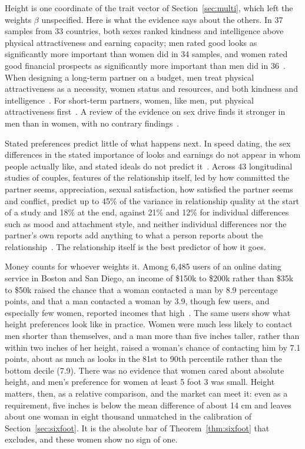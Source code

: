 \documentclass[11pt]{article}
\theoremstyle{definition}
\theoremstyle{remark}
\begin{document}
Height is one coordinate of the trait vector of Section~\ref{sec:multi},
which left the weights $\beta$ unspecified. Here is what the evidence
says about the others. In 37 samples from 33 countries, both sexes
ranked kindness and intelligence above physical attractiveness and
earning capacity; men rated good looks as significantly more important
than women did in 34 samples, and women rated good financial prospects
as significantly more important than men did in 36~\cite{buss}. When
designing a long-term partner on a budget, men treat physical
attractiveness as a necessity, women status and resources, and both
kindness and intelligence~\cite{li2002}. For short-term partners, women,
like men, put physical attractiveness first~\cite{li2006}. A review of
the evidence on sex drive finds it stronger in men than in women, with no
contrary findings~\cite{baumeister}.

Stated preferences predict little of what happens next. In speed dating,
the sex differences in the stated importance of looks and earnings do
not appear in whom people actually like, and stated ideals do not
predict it~\cite{eastwick}. Across 43 longitudinal studies of couples,
features of the relationship itself, led by how committed the partner
seems, appreciation, sexual satisfaction, how satisfied the partner seems
and conflict, predict up to 45\% of the variance in relationship quality
at the start of a study and 18\% at the end, against 21\% and 12\% for
individual differences such as mood and attachment style, and neither
individual differences nor the partner's own reports add anything to
what a person reports about the relationship~\cite{joel}. The
relationship itself is the best predictor of how it goes.

Money counts for whoever weights it. Among 6,485 users of an online
dating service in Boston and San Diego, an income of \$150k to \$200k
rather than \$35k to \$50k raised the chance that a woman contacted a man
by 8.9 percentage points, and that a man contacted a woman by 3.9,
though few users, and especially few women, reported incomes that
high~\cite{hitsch}. The same users show what height preferences look like
in practice. Women were much less likely to contact men shorter than
themselves, and a man more than five inches taller, rather than within
two inches of her height, raised a woman's chance of contacting him by
7.1 points, about as much as looks in the 81st to 90th percentile rather
than the bottom decile (7.9). There was no evidence that women cared
about absolute height, and men's preference for women at least 5 foot 3
was small. Height matters, then, as a relative comparison, and the
market can meet it: even as a requirement, five inches is below the mean
difference of about 14 cm and leaves about one woman in eight thousand
unmatched in the calibration of Section~\ref{sec:sixfoot}. It is the
absolute bar of Theorem~\ref{thm:sixfoot} that excludes, and these women
show no sign of one.
\end{document}
